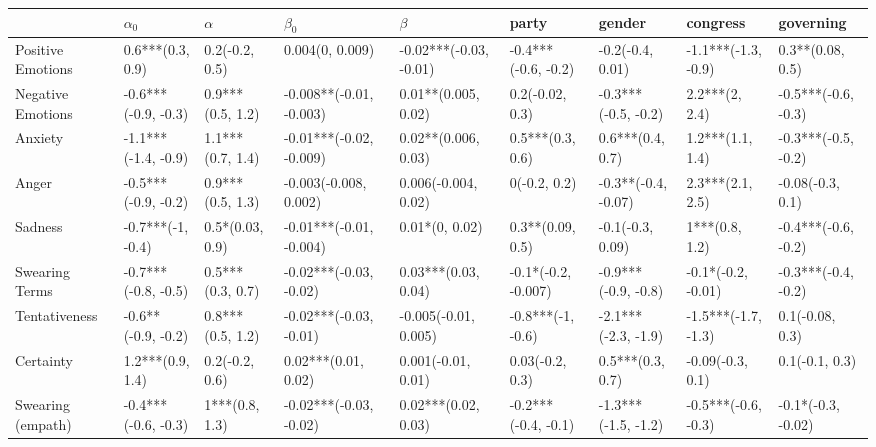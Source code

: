 \begin{tabular}{lllllllll}
\toprule
{} &           $\alpha_0$ &             $\alpha$ &                $\beta_0$ &                 $\beta$ &                party &               gender &             congress &            governing \\
\midrule
Positive Emotions     &     0.6***(0.3, 0.9) &       0.2(-0.2, 0.5) &          0.004(0, 0.009) &  -0.02***(-0.03, -0.01) &  -0.4***(-0.6, -0.2) &     -0.2(-0.4, 0.01) &  -1.1***(-1.3, -0.9) &     0.3**(0.08, 0.5) \\
Negative Emotions     &  -0.6***(-0.9, -0.3) &     0.9***(0.5, 1.2) &  -0.008**(-0.01, -0.003) &     0.01**(0.005, 0.02) &      0.2(-0.02, 0.3) &  -0.3***(-0.5, -0.2) &       2.2***(2, 2.4) &  -0.5***(-0.6, -0.3) \\
Anxiety               &  -1.1***(-1.4, -0.9) &     1.1***(0.7, 1.4) &  -0.01***(-0.02, -0.009) &     0.02**(0.006, 0.03) &     0.5***(0.3, 0.6) &     0.6***(0.4, 0.7) &     1.2***(1.1, 1.4) &  -0.3***(-0.5, -0.2) \\
Anger                 &  -0.5***(-0.9, -0.2) &     0.9***(0.5, 1.3) &    -0.003(-0.008, 0.002) &     0.006(-0.004, 0.02) &         0(-0.2, 0.2) &  -0.3**(-0.4, -0.07) &     2.3***(2.1, 2.5) &     -0.08(-0.3, 0.1) \\
Sadness               &    -0.7***(-1, -0.4) &      0.5*(0.03, 0.9) &  -0.01***(-0.01, -0.004) &          0.01*(0, 0.02) &     0.3**(0.09, 0.5) &     -0.1(-0.3, 0.09) &       1***(0.8, 1.2) &  -0.4***(-0.6, -0.2) \\
Swearing Terms        &  -0.7***(-0.8, -0.5) &     0.5***(0.3, 0.7) &   -0.02***(-0.03, -0.02) &     0.03***(0.03, 0.04) &  -0.1*(-0.2, -0.007) &  -0.9***(-0.9, -0.8) &   -0.1*(-0.2, -0.01) &  -0.3***(-0.4, -0.2) \\
Tentativeness         &   -0.6**(-0.9, -0.2) &     0.8***(0.5, 1.2) &   -0.02***(-0.03, -0.01) &    -0.005(-0.01, 0.005) &    -0.8***(-1, -0.6) &  -2.1***(-2.3, -1.9) &  -1.5***(-1.7, -1.3) &      0.1(-0.08, 0.3) \\
Certainty             &     1.2***(0.9, 1.4) &       0.2(-0.2, 0.6) &      0.02***(0.01, 0.02) &      0.001(-0.01, 0.01) &      0.03(-0.2, 0.3) &     0.5***(0.3, 0.7) &     -0.09(-0.3, 0.1) &       0.1(-0.1, 0.3) \\
Swearing (empath)     &  -0.4***(-0.6, -0.3) &       1***(0.8, 1.3) &   -0.02***(-0.03, -0.02) &     0.02***(0.02, 0.03) &  -0.2***(-0.4, -0.1) &  -1.3***(-1.5, -1.2) &  -0.5***(-0.6, -0.3) &   -0.1*(-0.3, -0.02) \\

\end{tabular}
